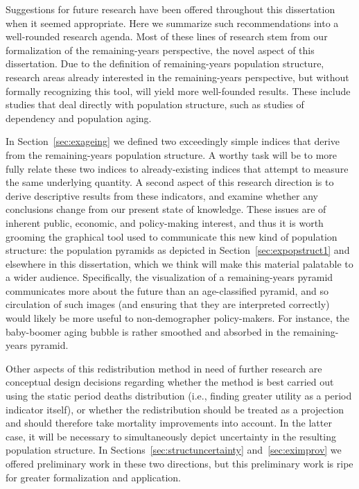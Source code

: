 
Suggestions for future research have been offered throughout this dissertation
when it seemed appropriate. Here we summarize such recommendations into a
well-rounded research agenda. Most of these lines of research stem
from our formalization of the remaining-years perspective, the novel aspect of
this dissertation. Due to the definition of remaining-years population
structure, research areas already interested in the remaining-years perspective,
but without formally recognizing this tool, will yield more well-founded
results. These include studies that deal directly with
population structure, such as studies of dependency and population aging. 

In Section~\ref{sec:exageing} we defined two exceedingly simple indices
that derive from the remaining-years population structure. A worthy task will
be to more fully relate these two indices to already-existing indices that
attempt to measure the same underlying quantity. A second aspect of this
research direction is to derive descriptive results from these indicators,
and examine whether any conclusions change from our present state of knowledge.
These issues are of inherent public, economic, and policy-making interest,
and thus it is worth grooming the graphical tool used to communicate this new
kind of population structure: the population pyramids as depicted in
Section~\ref{sec:expopstruct1} and elsewhere in this dissertation, which we
think will make this material palatable to a wider audience. Specifically, the
visualization of a remaining-years pyramid communicates more about the future
than an age-classified pyramid, and so circulation of such images (and ensuring
that they are interpreted correctly) would likely be more useful to
non-demographer policy-makers. For instance, the baby-boomer aging bubble is rather smoothed and
absorbed in the remaining-years pyramid. 

Other aspects of this redistribution method in need of further research are
conceptual design decisions regarding whether the method is best carried out
using the static period deaths distribution (i.e., finding greater utility as a
period indicator itself), or whether the redistribution should be treated as a
 projection and should therefore take mortality improvements into account.
In the latter case, it will be necessary to simultaneously depict uncertainty in
the resulting population structure. In
Sections~\ref{sec:structuncertainty} and~\ref{sec:eximprov} we offered
preliminary work in these two directions, but this preliminary work is ripe for
greater formalization and application.

